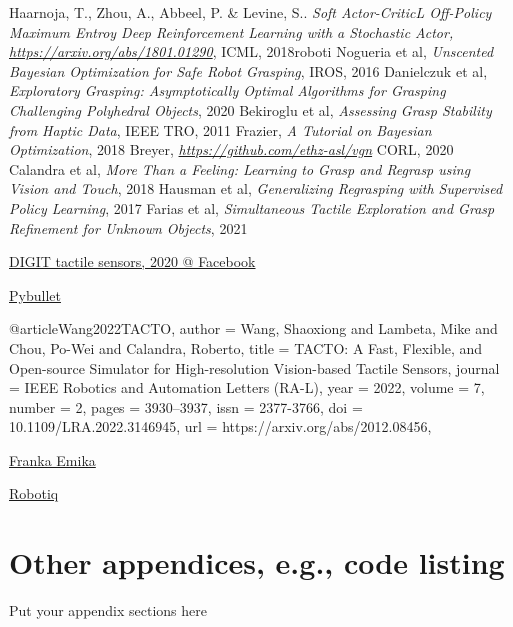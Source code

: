 \documentclass[a4paper]{report}
\theoremstyle{definition}
\begin{document}
\appendix
\begin{thebibliography}{9}
    Haarnoja, T., Zhou, A., Abbeel, P. & Levine, S..
    \textit{Soft Actor-CriticL Off-Policy Maximum Entroy Deep Reinforcement Learning with a Stochastic Actor, \href{https://arxiv.org/abs/1801.01290}{https://arxiv.org/abs/1801.01290}},
    ICML,
    2018roboti
    Nogueria et al,
    \textit{Unscented Bayesian Optimization for Safe Robot Grasping},
    IROS,
    2016
    Danielczuk et al,
    \textit{Exploratory Grasping: Asymptotically Optimal Algorithms for Grasping Challenging Polyhedral Objects},
    2020
    Bekiroglu et al,
    \textit{Assessing Grasp Stability from Haptic Data},
    IEEE TRO,
    2011
    Frazier,
    \textit{A Tutorial on Bayesian Optimization},
    2018
    Breyer,
    \textit{\href{https://github.com/ethz-asl/vgn}{https://github.com/ethz-asl/vgn}}
    CORL,
    2020
    Calandra et al,
    \textit{More Than a Feeling: Learning to Grasp and Regrasp using Vision and Touch},
    2018
    Hausman et al,
    \textit{Generalizing Regrasping with Supervised Policy Learning},
    2017
    Farias et al,
    \textit{Simultaneous Tactile Exploration and Grasp Refinement for Unknown Objects},
    2021

    \href{https://digit.ml/}{DIGIT tactile sensors, 2020 @ Facebook}

    \href{https://pybullet.org/wordpress/}{Pybullet}

@article{Wang2022TACTO,
  author   = {Wang, Shaoxiong and Lambeta, Mike and Chou, Po-Wei and Calandra, Roberto},
  title    = {{TACTO}: A Fast, Flexible, and Open-source Simulator for High-resolution Vision-based Tactile Sensors},
  journal  = {IEEE Robotics and Automation Letters (RA-L)},
  year     = {2022},
  volume   = {7},
  number   = {2},
  pages    = {3930--3937},
  issn     = {2377-3766},
  doi      = {10.1109/LRA.2022.3146945},
  url      = {https://arxiv.org/abs/2012.08456},
}

    \href{https://www.franka.de}{Franka Emika}

    \href{https://robotiq.com/products/2f85-140-adaptive-robot-gripper}{Robotiq}

\end{thebibliography}

\chapter{Other appendices, e.g., code listing}
Put your appendix sections here
\end{document}
